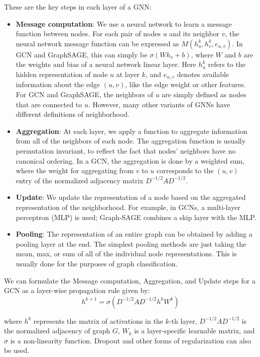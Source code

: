 \documentclass{article}
\numberwithin{figure}{section}
\begin{document}
These are the key steps in each layer of a GNN:
\begin{itemize}
    \item \textbf{Message computation}: We use a neural network to learn a message function between nodes. For each pair of nodes $u$ and its neighbor $v$, the neural network message function can be expressed as $M(h^k_u,h^k_v,e_{u,v})$. In GCN and GraphSAGE, this can simply be $\sigma(W h_v + b)$, where $W$ and $b$ are the weights and bias of a neural network linear layer. Here $h^k_u$ refers to the hidden representation of node $u$ at layer $k$, and $e_{u,v}$ denotes available information about the edge $(u, v)$, like the edge weight or other features. For GCN and GraphSAGE, the neighbors of $u$ are simply defined as nodes that are connected to $u$. However, many other variants of GNNs have different definitions of neighborhood.
    \item \textbf{Aggregation}: At each layer, we apply a function to aggregate information from all of the neighbors of each node. The aggregation function is usually permutation invariant, to reflect the fact that nodes’ neighbors have no canonical ordering. In a GCN, the aggregation is done by a weighted sum, where the weight for aggregating from $v$ to $u$ corresponds to the $(u,v)$ entry of the normalized adjacency matrix $D^{-1/2}AD^{-1/2}$.
    \item \textbf{Update}: We update the representation of a node based on the aggregated representation of the neighborhood. For example, in GCNs, a multi-layer perceptron (MLP) is used; Graph-SAGE combines a skip layer with the MLP.
    \item \textbf{Pooling}: The representation of an entire graph can be obtained by adding a pooling layer at the end. The simplest pooling methods are just taking the mean, max, or sum of all of the individual node representations. This is usually done for the purposes of graph classification.
\end{itemize}

We can formulate the Message computation, Aggregation, and Update steps for a GCN as a layer-wise propagation rule given by:
\begin{equation}
    h^{k+1} = \sigma(D^{-1/2} A D^{-1/2} h^k W^k)
\end{equation}

where $h^k$ represents the matrix of activations in the $k$-th layer, $D^{-1/2}AD^{-1/2}$ is the normalized adjacency of graph $G$, $W_k$ is a layer-specific learnable matrix, and $\sigma$ is a non-linearity function. Dropout and other forms of regularization can also be used.
\end{document}
